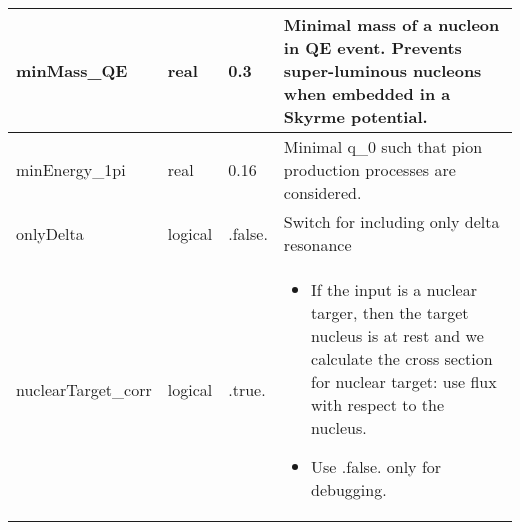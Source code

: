 \documentclass{article}
\begin{document}
\begin{longtable}{llll}
\midrule
minMass\_QE & \begin{minipage}[t]{2cm}real\end{minipage} & \begin{minipage}[t]{2cm}0.3\end{minipage} & \begin{minipage}[t]{12cm}Minimal mass of a nucleon in QE event. Prevents super-luminous nucleons when embedded in a Skyrme potential.\end{minipage}\\*
\midrule
minEnergy\_1pi & \begin{minipage}[t]{2cm}real\end{minipage} & \begin{minipage}[t]{2cm}0.16\end{minipage} & \begin{minipage}[t]{12cm}Minimal q\_0 such that pion production processes are considered.\end{minipage}\\*
\midrule
onlyDelta & \begin{minipage}[t]{2cm}logical\end{minipage} & \begin{minipage}[t]{2cm}.false.\end{minipage} & \begin{minipage}[t]{12cm}Switch for including only delta resonance\end{minipage}\\*
\midrule
nuclearTarget\_corr & \begin{minipage}[t]{2cm}logical\end{minipage} & \begin{minipage}[t]{2cm}.true.\end{minipage} & \begin{minipage}[t]{12cm}\begin{itemize}\leftmargin0em\itemindent0pt\item If the input is a nuclear targer, then the target nucleus is at rest   and we calculate the cross section for   nuclear target: use flux with respect to the nucleus.\item Use .false. only for debugging.\end{itemize}\end{minipage}\\*
\bottomrule
\end{longtable}
{ }



\end{document}
